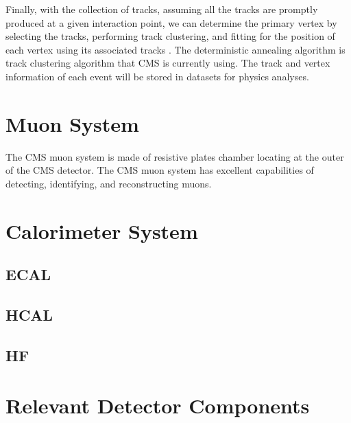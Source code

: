 Finally, with the collection of tracks, assuming all the tracks are promptly produced at a given interaction point, we can determine the primary vertex by selecting the tracks, performing track clustering, and fitting for the position of each vertex using its associated tracks \cite{CMSTrackComp}. The deterministic annealing algorithm \cite{DAAlgo} is track clustering algorithm that CMS is currently using. The track and vertex information of each event will be stored in datasets for physics analyses.

\section{Muon System}

The CMS muon system is made of resistive plates chamber \cite{} locating at the outer of the CMS detector. The CMS muon system has excellent capabilities of detecting, identifying, and reconstructing muons. 
\section{Calorimeter System}

\subsection{ECAL}

\subsection{HCAL}

\subsection{HF}

\section{Relevant Detector Components}



